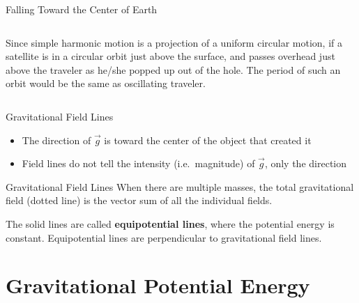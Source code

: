 \documentclass[12pt,compress,aspectratio=169]{beamer}
\begin{document}
\begin{frame}{Falling Toward the Center of Earth}
  \begin{columns}

    Since simple harmonic motion is a projection of a uniform circular motion,
    if a satellite is in a circular orbit just above the surface, and passes
    overhead just above the traveler as he/she popped up out of the hole. The
    period of such an orbit would be the same as oscillating traveler.
  \end{columns}
\end{frame}



\begin{frame}{Gravitational Field Lines}
  \begin{center}
  \end{center}
  \begin{itemize}
  \item The direction of $\vec g$ is toward the center of the object that
    created it
  \item Field lines do not tell the intensity (i.e.\ magnitude) of $\vec g$,
    only the direction
  \end{itemize}
\end{frame}



\begin{frame}{Gravitational Field Lines}
  When there are multiple masses, the total gravitational field (dotted line)
  is the vector sum of all the individual fields.
  \begin{center}
  \end{center}
  The solid lines are called \textbf{equipotential lines}, where the potential
  energy is constant. Equipotential lines are perpendicular to
  gravitational field lines.
\end{frame}



\section{Gravitational Potential Energy}
\end{document}

